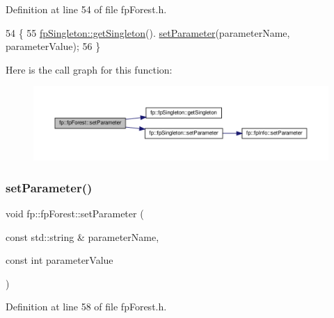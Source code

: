 Definition at line 54 of file fp\+Forest.\+h.


\begin{DoxyCode}
54                                                                                                  \{
55                 \hyperlink{classfp_1_1fpSingleton_a8bdae77b68521003e3fc630edec2e240}{fpSingleton::getSingleton}().
      \hyperlink{classfp_1_1fpSingleton_a90f275b256694ea7b16577d547a33044}{setParameter}(parameterName, parameterValue);    
56             \}
\end{DoxyCode}
Here is the call graph for this function\+:\nopagebreak
\begin{figure}[H]
\begin{center}
\leavevmode
\includegraphics[width=350pt]{classfp_1_1fpForest_afc7a14e083aaae0dbd90ef0a30c48c21_cgraph}
\end{center}
\end{figure}
\mbox{\label{classfp_1_1fpForest_a8a083cc4cd4110dee2b6627d53529965}} 
\subsubsection{\texorpdfstring{set\+Parameter()}{setParameter()}\hspace{0.1cm}{\footnotesize\ttfamily [3/3]}}
{\footnotesize\ttfamily void fp\+::fp\+Forest\+::set\+Parameter (\begin{DoxyParamCaption}\item[{const std\+::string \&}]{parameter\+Name,  }\item[{const int}]{parameter\+Value }\end{DoxyParamCaption})\hspace{0.3cm}{\ttfamily [inline]}}



Definition at line 58 of file fp\+Forest.\+h.


